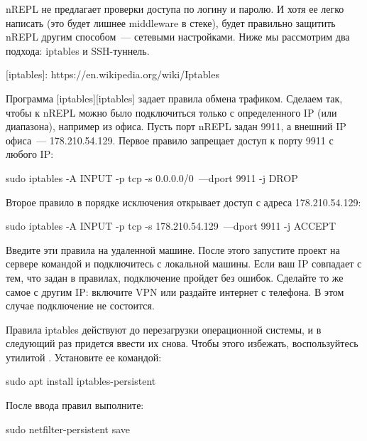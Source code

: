 nREPL не предлагает проверки доступа по логину и паролю. И хотя ее легко написать (это будет лишнее middleware в стеке), будет правильно защитить nREPL другим способом~--- сетевыми настройками. Ниже мы рассмотрим два подхода: iptables и SSH-туннель.

[iptables]: https://en.wikipedia.org/wiki/Iptables

Программа [iptables][iptables] задает правила обмена трафиком. Сделаем так, чтобы к nREPL можно было подключиться только с определенного IP (или диапазона), например из офиса. Пусть порт nREPL задан 9911, а внешний IP офиса~--- 178.210.54.129. Первое правило запрещает доступ к порту 9911 с любого IP:

\begin{english}
  \begin{bash}
sudo iptables -A INPUT -p tcp -s 0.0.0.0/0~---dport 9911 -j DROP
  \end{bash}
\end{english}

Второе правило в порядке исключения открывает доступ с адреса 178.210.54.129:

\begin{english}
  \begin{bash}
sudo iptables -A INPUT -p tcp -s 178.210.54.129~---dport 9911 -j ACCEPT
  \end{bash}
\end{english}

Введите эти правила на удаленной машине. После этого запустите проект на сервере командой  и подключитесь с локальной машины. Если ваш IP совпадает с тем, что задан в правилах, подключение пройдет без ошибок. Сделайте то же самое с другим IP: включите VPN или раздайте интернет с телефона. В этом случае подключение не состоится.

Правила iptables действуют до перезагрузки операционной системы, и в следующий раз придется ввести их снова. Чтобы этого избежать, воспользуйтесь утилитой . Установите ее командой:

\begin{english}
  \begin{bash}
sudo apt install iptables-persistent
  \end{bash}
\end{english}

После ввода правил выполните:

\begin{english}
  \begin{bash}
sudo netfilter-persistent save
  \end{bash}
\end{english}

